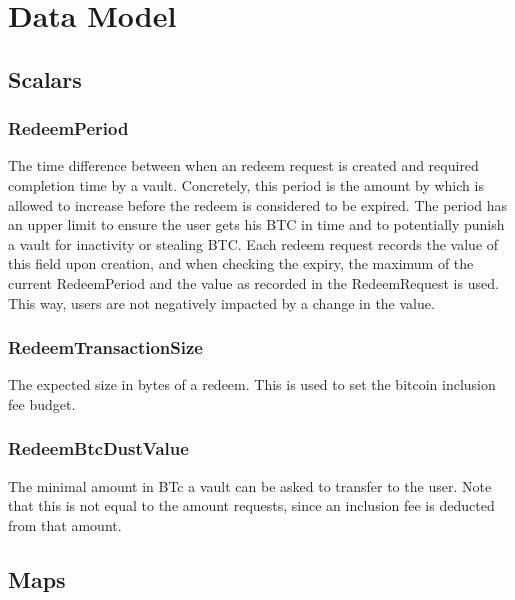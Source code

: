 \documentclass[a4paper,10pt,english]{sphinxmanual}
\begin{document}
\section{Data Model}
\label{\detokenize{spec/redeem:data-model}}

\subsection{Scalars}
\label{\detokenize{spec/redeem:scalars}}

\subsubsection{RedeemPeriod}
\label{\detokenize{spec/redeem:redeemperiod}}\label{\detokenize{spec/redeem:id1}}
The time difference between when an redeem request is created and required completion time by a vault. Concretely, this period is the amount by which {\hyperref[\detokenize{spec/security:activeblockcount}]{}} is allowed to increase before the redeem is considered to be expired. The period has an upper limit to ensure the user gets his BTC in time and to potentially punish a vault for inactivity or stealing BTC. Each redeem request records the value of this field upon creation, and when checking the expiry, the maximum of the current RedeemPeriod and the value as recorded in the RedeemRequest is used. This way, users are not negatively impacted by a change in the value.


\subsubsection{RedeemTransactionSize}
\label{\detokenize{spec/redeem:redeemtransactionsize}}\label{\detokenize{spec/redeem:id2}}
The expected size in bytes of a redeem. This is used to set the bitcoin inclusion fee budget.


\subsubsection{RedeemBtcDustValue}
\label{\detokenize{spec/redeem:redeembtcdustvalue}}\label{\detokenize{spec/redeem:id3}}
The minimal amount in BTc a vault can be asked to transfer to the user. Note that this is not equal to the amount requests, since an inclusion fee is deducted from that amount.


\subsection{Maps}
\label{\detokenize{spec/redeem:maps}}
\end{document}
